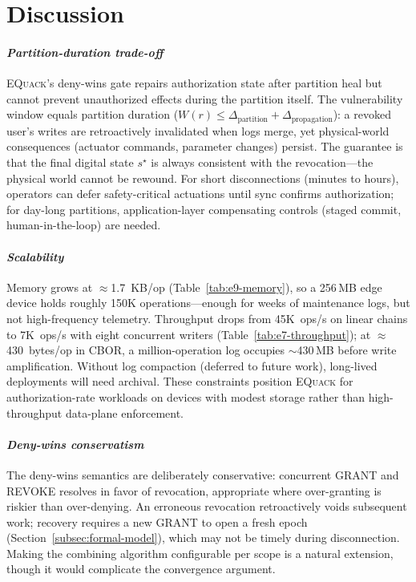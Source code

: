 \documentclass[10pt,journal,compsoc]{IEEEtran}
\newcommand{\equack}{\textsc{EQuack}}
\begin{document}
\section{Discussion}
\label{sec:discussion}

\paragraph*{\textit{Partition-duration trade-off}}
\equack{}'s deny-wins gate repairs authorization state after partition heal but cannot prevent unauthorized effects during the partition itself. The vulnerability window equals partition duration ($W(r) \leq \Delta_{\text{partition}} + \Delta_{\text{propagation}}$): a revoked user's writes are retroactively invalidated when logs merge, yet physical-world consequences (actuator commands, parameter changes) persist. The guarantee is that the final digital state $s^\star$ is always consistent with the revocation---the physical world cannot be rewound. For short disconnections (minutes to hours), operators can defer safety-critical actuations until sync confirms authorization; for day-long partitions, application-layer compensating controls (staged commit, human-in-the-loop) are needed.

\paragraph*{\textit{Scalability}}
Memory grows at $\approx$1.7~KB/op (Table~\ref{tab:e9-memory}), so a 256\,MB edge device holds roughly 150K operations---enough for weeks of maintenance logs, but not high-frequency telemetry. Throughput drops from 45K~ops/s on linear chains to 7K~ops/s with eight concurrent writers (Table~\ref{tab:e7-throughput}); at $\approx$430~bytes/op in CBOR, a million-operation log occupies $\sim$430\,MB before write amplification. Without log compaction (deferred to future work), long-lived deployments will need archival. These constraints position \equack{} for authorization-rate workloads on devices with modest storage rather than high-throughput data-plane enforcement.

\paragraph*{\textit{Deny-wins conservatism}}
The deny-wins semantics are deliberately conservative: concurrent GRANT and REVOKE resolves in favor of revocation, appropriate where over-granting is riskier than over-denying. An erroneous revocation retroactively voids subsequent work; recovery requires a new GRANT to open a fresh epoch (Section~\ref{subsec:formal-model}), which may not be timely during disconnection. Making the combining algorithm configurable per scope is a natural extension, though it would complicate the convergence argument.
\end{document}
